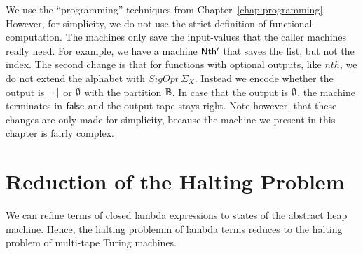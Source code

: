 We use the ``programming'' techniques from Chapter~\ref{chap:programming}.  However, for simplicity, we do not use the strict definition of functional
computation.  The machines only save the input-values that the caller machines really need.  For example, we have a machine $\mathsf{Nth'}$ that saves the
list, but not the index.  The second change is that for functions with optional outputs, like $nth$, we do not extend the alphabet with
$SigOpt~\Sigma_X$.  Instead we encode whether the output is $\left\lfloor {\cdot} \right\rfloor$ or $\emptyset$ with the partition $\mathbb{B}$.  In case that the output is $\emptyset$,
the machine terminates in $\mathsf{false}$ and the output tape stays right.  Note however, that these changes are only made for simplicity, because the
machine we present in this chapter is fairly complex.




\section{Reduction of the Halting Problem}
\label{sec:halting-problem}

We can refine terms of closed lambda expressions to states of the abstract heap machine.  Hence, the halting problemm of lambda terms reduces to the
halting problem of multi-tape Turing machines.




